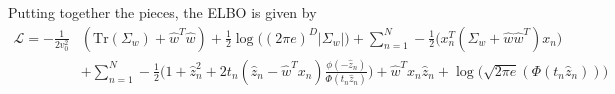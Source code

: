 \documentclass{article}
\begin{document}

Putting together the pieces, the ELBO is given by
\begin{align*}
\mathcal L 
= - \frac{1}{2v_0^2}& (\text{Tr}(\Sigma_w) + \hat w^T \hat w) 
+  \frac{1}{2}\log \big((2\pi e)^D |\Sigma_w|) 
+ \sum_{n=1}^N - \frac{1}{2} \Big(x_n^T(\Sigma_w + \hat w \hat w^T)x_n\Big) \\
&+\sum_{n=1}^N
 -\frac{1}{2}\Big(1 + \hat z_n^2  + 2t_n(\hat z_n-\hat w^Tx_n) \frac{\phi(-\hat z_n)}{\Phi(t_n\hat z_n)}\Big) 
 + \hat w^Tx_n\hat z_n 
 + \log\Big(\sqrt{2\pi e} (\Phi(t_n\hat z_n))\Big) 
\end{align*}
\end{document}
